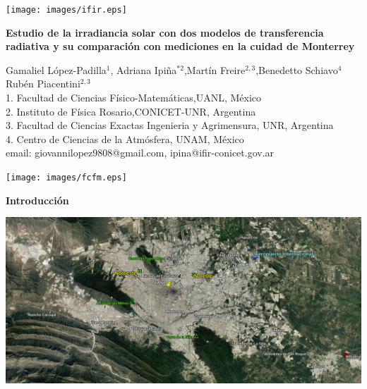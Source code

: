 \documentclass{article}
\begin{document}
\vspace*{-2cm}
\changefontsizes{14pt}
\hspace*{-1cm}
\begin{minipage}{0.2\linewidth}
\vspace{0.7cm}
\vspace*{-0.15cm}
\texttt{[image: images/ifir.eps]}
\end{minipage}
\vspace*{-0.4cm}
\begin{minipage}{0.65\linewidth}
\vspace*{0.7cm}
\begin{center}
\changefontsizes{15pt}
\hspace*{-0.1cm}
\textbf{\textcolor{ver}{Estudio de la irradiancia solar con dos modelos de transferencia radiativa y su comparación con mediciones en la cuidad de Monterrey}}
\end{center}
\vspace{-1cm}
\begin{center}
\changefontsizes{11pt}
Gamaliel López-Padilla$^1$, Adriana Ipiña$^{*2}$,Martín Freire$^{2,3}$,Benedetto Schiavo$^{4}$ Rubén Piacentini$^{2,3}$\\
1. Facultad de Ciencias Físico-Matemáticas,UANL, México\\
2. Instituto de Física Rosario,CONICET-UNR, Argentina\\
3. Facultad de Ciencias Exactas Ingenieria y Agrimensura, UNR, Argentina\\
4. Centro de Ciencias de la Atmósfera, UNAM, México\\
email: giovannilopez9808@gmail.com, ipina@ifir-conicet.gov.ar
\end{center}
\end{minipage}
\begin{minipage}{0.2\linewidth}
\hspace*{0.2cm}
\texttt{[image: images/fcfm.eps]}
\end{minipage}
\vspace{0.2cm}
\changefontsizes{12pt}
\begin{center}
\begin{shaded}
\textbf{\textcolor{ver}{Introducción}}
\end{shaded}
\end{center}
\begin{minipage}{0.47\linewidth}
\includegraphics[scale=0.101]{images/satelite.jpg}\\
\end{minipage}
\end{document}
